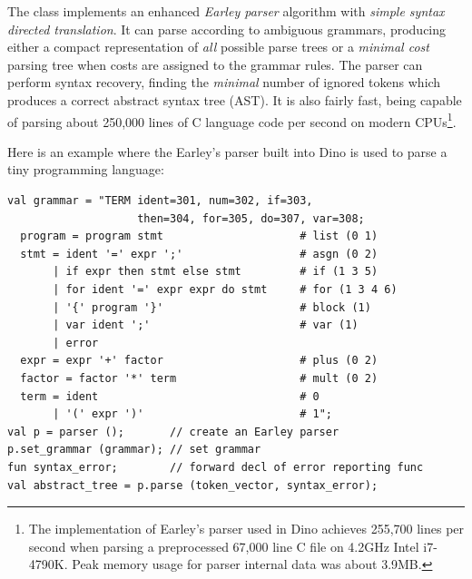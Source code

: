 \documentclass[preprint]{sigplanconf}
\begin{document}
The class implements an enhanced \emph{Earley parser} algorithm with
\emph{simple syntax directed translation}.
It can parse according to ambiguous grammars, producing either a compact representation of \emph{all} possible parse trees or a \emph{minimal cost} parsing tree when costs are assigned to the grammar rules. %
The parser can perform syntax recovery, finding the \emph{minimal}
number of ignored tokens which produces a correct abstract syntax tree (AST).  It is also fairly fast, being capable of parsing about 250,000 lines of C
language code per second on modern CPUs\footnote{The implementation of Earley's parser used in Dino achieves 255,700 lines per second when parsing a preprocessed 67,000 line C file on 4.2GHz Intel i7-4790K. Peak memory usage for parser internal data was about 3.9MB.}.

Here is an example where the Earley's parser built into Dino is used to parse a tiny programming language:

{\scriptsize
\begin{verbatim}
val grammar = "TERM ident=301, num=302, if=303,
                    then=304, for=305, do=307, var=308;
  program = program stmt                     # list (0 1)
  stmt = ident '=' expr ';'                  # asgn (0 2)
       | if expr then stmt else stmt         # if (1 3 5)
       | for ident '=' expr expr do stmt     # for (1 3 4 6)
       | '{' program '}'                     # block (1)
       | var ident ';'                       # var (1)
       | error
  expr = expr '+' factor                     # plus (0 2)
  factor = factor '*' term                   # mult (0 2)
  term = ident                               # 0
       | '(' expr ')'                        # 1";
val p = parser ();       // create an Earley parser
p.set_grammar (grammar); // set grammar
fun syntax_error;        // forward decl of error reporting func
val abstract_tree = p.parse (token_vector, syntax_error);
\end{verbatim}
}
\end{document}
